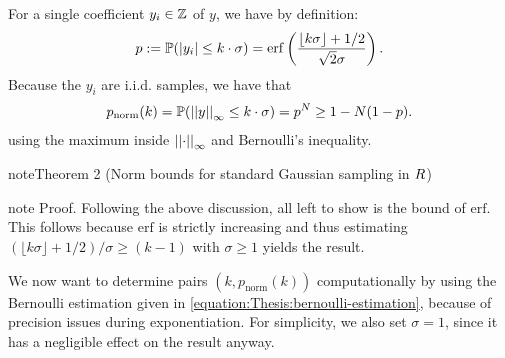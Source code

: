 \documentclass[letterpaper,10pt,english]{jupyterBook}
\begin{document}
\sphinxAtStartPar
For a single coefficient \(y_i \in \mathbb Z\) of \(y\), we have by definition:
\begin{equation*}
\begin{split}p := \mathbb P(\left\lvert y_i \right\rvert \le k \cdot \sigma) = \mathrm{erf}\left( \frac{\lfloor k\sigma \rfloor + 1/2}{\sqrt{2}\sigma}\right).\end{split}
\end{equation*}
\sphinxAtStartPar
Because the \(y_i\) are i.i.d. samples, we have that
\begin{equation}\label{equation:Thesis:bernoulli-estimation}
\begin{split}    p_{\text{norm}}(k) = \mathbb P(\left\lvert\left\lvert y \right\rvert\right\rvert_\infty \le k \cdot \sigma) = p^N \ge 1 - N (1-p).\end{split}
\end{equation}
\sphinxAtStartPar
using the maximum inside \(\left\lvert\left\lvert \cdot \right\rvert\right\rvert_\infty\) and Bernoulli’s inequality.
\label{Thesis:sampling-bound}
\begin{sphinxadmonition}{note}{Theorem 2 (Norm bounds for standard Gaussian sampling in \protect\(R\protect\))}
\end{sphinxadmonition}

\begin{sphinxadmonition}{note}
\sphinxAtStartPar
Proof. Following the above discussion, all left to show is the bound of \(\mathrm{erf}\). This follows because \(\mathrm{erf}\) is strictly increasing and thus estimating \((\lfloor k \sigma \rfloor + 1/2)/\sigma \ge (k-1)\) with \(\sigma \ge 1\) yields the result.
\end{sphinxadmonition}

\sphinxAtStartPar
We now want to determine pairs \((k,p_{\text{norm}}(k))\) computationally by using the Bernoulli estimation given in \eqref{equation:Thesis:bernoulli-estimation}, because of precision issues during exponentiation.
For simplicity, we also set \(\sigma = 1\), since it has a negligible effect on the result anyway.
\end{document}
